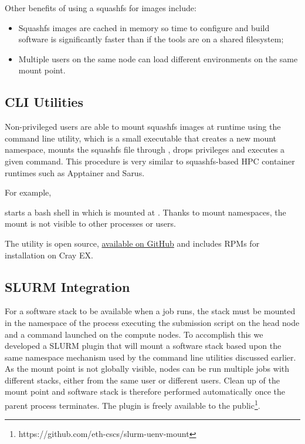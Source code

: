 Other benefits of using a squashfs for images include:
\begin{itemize}
    \item Squashfs images are cached in memory so time to configure and build software is significantly faster than if the tools are on a shared filesystem;
    \item Multiple users on the same node can load different environments on the same mount point.
\end{itemize}

\subsection{CLI Utilities}


Non-privileged users are able to mount squashfs images at runtime using the  command line utility, which is a small  executable that creates a new mount namespace, mounts the squashfs file through , drops privileges and executes a given command.
This procedure is very similar to squashfs-based HPC container runtimes such as Apptainer and Sarus.

For example,



starts a bash shell in which  is mounted at .
Thanks to mount namespaces, the mount is not visible to other processes or users.

The utility is open source, \href{https://github.com/eth-cscs/squashfs-mount}{available on GitHub} and includes RPMs for installation on Cray EX.

\subsection{SLURM Integration}


For a software stack to be available when a job runs, the stack must be mounted in the namespace of the process executing the submission script on the head node and a command launched on the compute nodes.
To accomplish this we developed a SLURM plugin that will mount a software stack based upon the same namespace mechanism used by the command line utilities discussed earlier.
As the mount point is not globally visible, nodes can be run multiple jobs with different stacks, either from the same user or different users.
Clean up of the mount point and software stack is therefore performed automatically once the parent process terminates.
The plugin is freely available to the public\footnote{https://github.com/eth-cscs/slurm-uenv-mount}.

